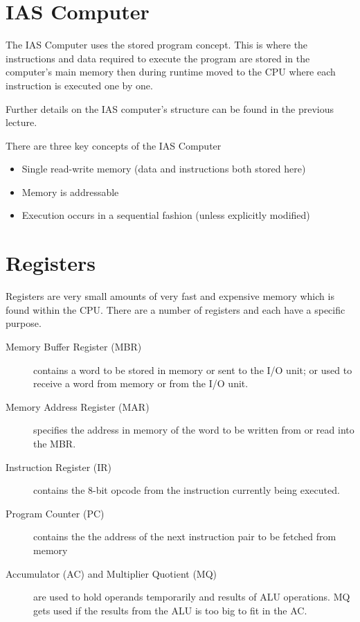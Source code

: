 
\section{IAS Computer}
The IAS Computer uses the stored program concept. This is where the instructions and data required to execute the program are stored in the computer's main memory then during runtime moved to the CPU where each instruction is executed one by one.

Further details on the IAS computer's structure can be found in the previous lecture. 

There are three key concepts of the IAS Computer
\begin{itemize}
    \item Single read-write memory (data and instructions both stored here)
    \item Memory is addressable
    \item Execution occurs in a sequential fashion (unless explicitly modified)
\end{itemize}

\section{Registers}
Registers are very small amounts of very fast and expensive memory which is found within the CPU. There are a number of registers and each have a specific purpose. 

\begin{description}
    \item[Memory Buffer Register (MBR)] contains a word to be stored in memory or sent to the I/O unit; or used to receive a word from memory or from the I/O unit.
    \item[Memory Address Register (MAR)] specifies the address in memory of the word to be written from or read into the MBR.
    \item[Instruction Register (IR)] contains the 8-bit opcode from the instruction currently being executed.
    \item[Program Counter (PC)] contains the the address of the next instruction pair to be fetched from memory
    \item[Accumulator (AC) and Multiplier Quotient (MQ)] are used to hold operands temporarily and results of ALU operations. MQ gets used if the results from the ALU is too big to fit in the AC.
\end{description} 

